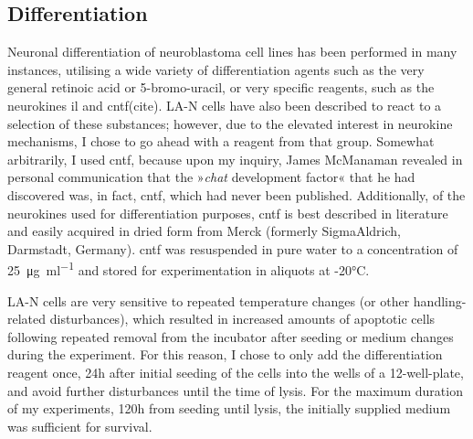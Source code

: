 \subsection{Differentiation}
Neuronal differentiation of neuroblastoma cell lines has been performed in many instances, utilising a wide variety of differentiation agents such as the very general retinoic acid or 5-bromo-uracil, or very specific reagents, such as the neurokines \ac{il} and \ac{cntf}(cite). LA-N cells have also been described to react to a selection of these substances; however, due to the elevated interest in neurokine mechanisms, I chose to go ahead with a reagent from that group. Somewhat arbitrarily, I used \ac{cntf}, because upon my inquiry, James McManaman revealed in personal communication that the »\textit{\ac{chat}} development factor« that he had discovered\cite{McManaman1988} was, in fact, \ac{cntf}, which had never been published. Additionally, of the neurokines used for differentiation purposes, \ac{cntf} is best described in literature and easily acquired in dried form from Merck (formerly SigmaAldrich, Darmstadt, Germany). \ac{cntf} was resuspended in pure water to a concentration of \SI{25}{\micro\gram\per\milli\litre} and stored for experimentation in aliquots at -20°C.

LA-N cells are very sensitive to repeated temperature changes (or other handling-related disturbances), which resulted in increased amounts of apoptotic cells following repeated removal from the incubator after seeding or medium changes during the experiment. For this reason, I chose to only add the differentiation reagent once, 24h after initial seeding of the cells into the wells of a 12-well-plate, and avoid further disturbances until the time of lysis. For the maximum duration of my experiments, 120h from seeding until lysis, the initially supplied medium was sufficient for survival.

